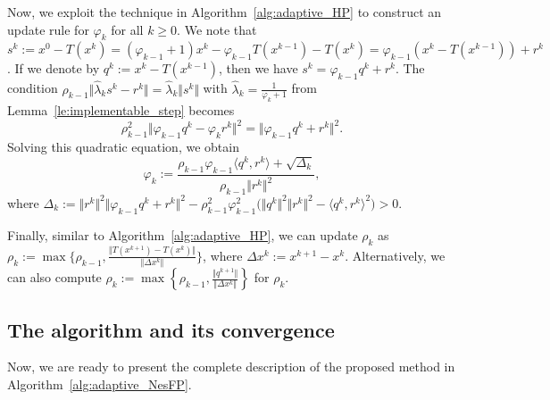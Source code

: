 \documentclass{article}
\theoremstyle{plain}
\theoremstyle{definition}
\newcommand{\set}[1]{\left\{#1\right\}}
\newcommand{\sets}[1]{\{#1\}}
\newcommand{\norms}[1]{\Vert#1\Vert}
\newcommand{\iprods}[1]{\langle #1\rangle}
\newcommand{\0}{\boldsymbol{0}}
\begin{document}
Now, we exploit the technique in Algorithm~\ref{alg:adaptive_HP} to construct an update rule for $\varphi_k$ for all $k \geq 0$.
We note that $s^k := x^0 - T(x^k) = (\varphi_{k-1} + 1)x^k - \varphi_{k-1}T(x^{k-1}) - T(x^k) = \varphi_{k-1}(x^k - T(x^{k-1})) + r^k$.
If we denote by $q^k := x^k - T(x^{k-1})$, then we have $s^k = \varphi_{k-1}q^k + r^k$.
The condition $\rho_{k-1}\norms{\hat{\lambda}_ks^k - r^k} = \hat{\lambda}_k\norms{s^k}$ with $\hat{\lambda}_k = \frac{1}{\varphi_k + 1}$ from Lemma~\ref{le:implementable_step} becomes
\begin{equation*} 
\rho_{k-1}^2\norms{\varphi_{k-1}q^k - \varphi_kr^k}^2 = \norms{\varphi_{k-1}q^k + r^k}^2.
\end{equation*}
Solving this quadratic equation, we obtain 
\begin{equation}\label{eq:varphi_k_update}
\varphi_k :=   \frac{\rho_{k-1}\varphi_{k-1}\iprods{q^k, r^k} + \sqrt{\Delta_k}}{\rho_{k-1}\norms{r^k}^2},
\end{equation}
where $\Delta_k := \norms{r^k}^2\norms{\varphi_{k-1}q^k + r^k}^2 - \rho_{k-1}^2\varphi_{k-1}^2\big(\norms{q^k}^2\norms{r^k}^2  - \iprods{q^k, r^k}^2 \big) > 0$.

Finally, similar to Algorithm~\ref{alg:adaptive_HP}, we can update $\rho_k$ as $\rho_k := \max\sets{\rho_{k-1}, \frac{\norms{T(x^{k+1}) - T(x^k)}}{\norms{\Delta{x}^k}}}$, where $\Delta{x}^k := x^{k+1} - x^k$.
Alternatively, we can also compute $\rho_{k} := \max\set{\rho_{k-1}, \frac{\norms{q^{k+1}} }{\norms{\Delta{x}^k} }}$ for $\rho_k$. 

\subsection{The algorithm and its convergence}\label{subsec:Nes_convergence}
Now, we are ready to present the complete description of the proposed method in Algorithm~\ref{alg:adaptive_NesFP}.
\end{document}
